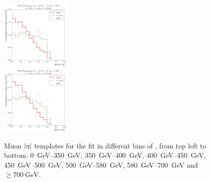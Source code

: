 \begin{figure}[!htbp]
    {\includegraphics[width=0.3\textwidth]{measurement/ST/central/fit_templates/muon_templates_bin_580-700}}\\
    {\includegraphics[width=0.3\textwidth]{measurement/ST/central/fit_templates/muon_templates_bin_700-inf}}
    \caption[Muon $\abs \eta$ templates for the fit in different bins of \ST]{Muon $\abs \eta$ templates for the fit in
    different bins of \ST, from top left to bottom: \SIrange{0}{350}{\GeV}, \SIrange{350}{400}{\GeV},
    \SIrange{400}{450}{\GeV}, \SIrange{450}{500}{\GeV}, \SIrange{500}{580}{\GeV}, \SIrange{580}{700}{\GeV} and $\geq
    \SI{700}{\GeV}$.}
    \label{fig:fit_templates_ST_muon}
\end{figure}

\newpage
{}

